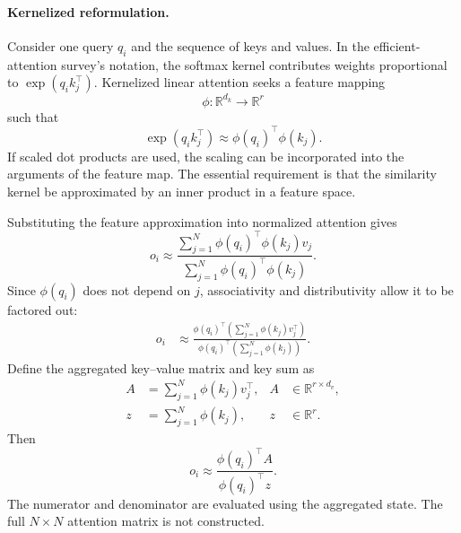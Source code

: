 \paragraph{Kernelized reformulation.}
Consider one query \(q_i\) and the sequence of keys and values.
In the efficient-attention survey's notation, the softmax kernel
contributes weights proportional to \(\exp(q_i k_j^\top)\). Kernelized linear attention seeks a feature
mapping
\begin{equation}
    \phi:\mathbb{R}^{d_k}\longrightarrow\mathbb{R}^{r}
    \label{eq:attn-linear-feature-map}
\end{equation}
such that
\begin{equation}
    \exp(q_i k_j^\top)
    \approx
    \phi(q_i)^\top\phi(k_j).
    \label{eq:attn-linear-kernel-approximation}
\end{equation}
If scaled dot products are used, the scaling can be incorporated into
the arguments of the feature map. The essential requirement is that
the similarity kernel be approximated by an inner product in a feature
space.

Substituting the feature approximation into normalized attention gives
\begin{equation}
    o_i
    \approx
    \frac{
        \sum_{j=1}^{N}
        \phi(q_i)^\top\phi(k_j)v_j
    }{
        \sum_{j=1}^{N}
        \phi(q_i)^\top\phi(k_j)
    }.
    \label{eq:attn-linear-substitution}
\end{equation}
Since \(\phi(q_i)\) does not depend on \(j\), associativity and
distributivity allow it to be factored out:
\begin{align}
    o_i
    &\approx
    \frac{
        \phi(q_i)^\top
        \left(
            \sum_{j=1}^{N}\phi(k_j)v_j^\top
        \right)
    }{
        \phi(q_i)^\top
        \left(
            \sum_{j=1}^{N}\phi(k_j)
        \right)
    }.
    \label{eq:attn-linear-reordered}
\end{align}
Define the aggregated key--value matrix and key sum as
\begin{align}
    A&=
    \sum_{j=1}^{N}\phi(k_j)v_j^\top,
    & A&\in\mathbb{R}^{r\times d_v},
    \label{eq:attn-linear-state-matrix}\\
    z&=
    \sum_{j=1}^{N}\phi(k_j),
    & z&\in\mathbb{R}^{r}.
    \label{eq:attn-linear-normalizer-state}
\end{align}
Then
\begin{equation}
    \boxed{
    o_i
    \approx
    \frac{\phi(q_i)^\top A}
         {\phi(q_i)^\top z}
    }.
    \label{eq:attn-linear-output-state}
\end{equation}
The numerator and denominator are evaluated using the aggregated state.
The full \(N\times N\) attention matrix is not constructed.

